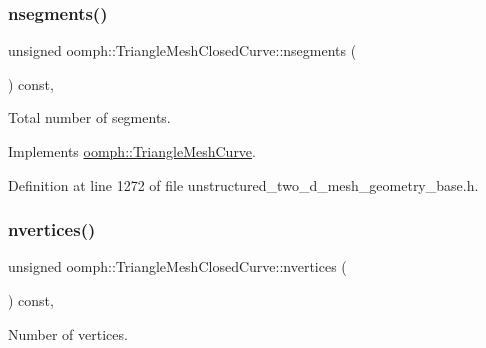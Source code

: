 \mbox{\label{classoomph_1_1TriangleMeshClosedCurve_a6d8c26d0ecfaf5abff2f68fedf158612}} 
\subsubsection{\texorpdfstring{nsegments()}{nsegments()}}
{\footnotesize\ttfamily unsigned oomph\+::\+Triangle\+Mesh\+Closed\+Curve\+::nsegments (\begin{DoxyParamCaption}{ }\end{DoxyParamCaption}) const\hspace{0.3cm}{\ttfamily [inline]}, {\ttfamily [virtual]}}



Total number of segments. 



Implements \hyperlink{classoomph_1_1TriangleMeshCurve_abb1f60baf8d94f54f409ae51417e2568}{oomph\+::\+Triangle\+Mesh\+Curve}.



Definition at line 1272 of file unstructured\+\_\+two\+\_\+d\+\_\+mesh\+\_\+geometry\+\_\+base.\+h.

\mbox{\label{classoomph_1_1TriangleMeshClosedCurve_a439e4085f7e220364bbe9bc8040ec72f}} 
\subsubsection{\texorpdfstring{nvertices()}{nvertices()}}
{\footnotesize\ttfamily unsigned oomph\+::\+Triangle\+Mesh\+Closed\+Curve\+::nvertices (\begin{DoxyParamCaption}{ }\end{DoxyParamCaption}) const\hspace{0.3cm}{\ttfamily [inline]}, {\ttfamily [virtual]}}



Number of vertices. 




